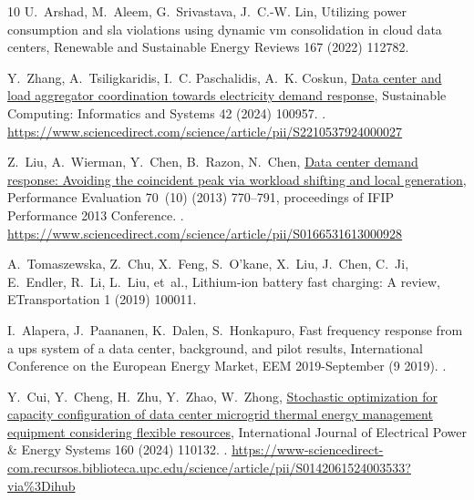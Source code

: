 \documentclass[preprint,12pt]{elsarticle}
\begin{document}
\begin{thebibliography}{10}
U.~Arshad, M.~Aleem, G.~Srivastava, J.~C.-W. Lin, Utilizing power consumption
  and sla violations using dynamic vm consolidation in cloud data centers,
  Renewable and Sustainable Energy Reviews 167 (2022) 112782.

Y.~Zhang, A.~Tsiligkaridis, I.~C. Paschalidis, A.~K. Coskun,
  \href{https://www.sciencedirect.com/science/article/pii/S2210537924000027}{Data
  center and load aggregator coordination towards electricity demand response},
  Sustainable Computing: Informatics and Systems 42 (2024) 100957.
\newblock \href {https://doi.org/https://doi.org/10.1016/j.suscom.2024.100957}
  {}.
\newline\urlprefix\url{https://www.sciencedirect.com/science/article/pii/S2210537924000027}

Z.~Liu, A.~Wierman, Y.~Chen, B.~Razon, N.~Chen,
  \href{https://www.sciencedirect.com/science/article/pii/S0166531613000928}{Data
  center demand response: Avoiding the coincident peak via workload shifting
  and local generation}, Performance Evaluation 70~(10) (2013) 770--791,
  proceedings of IFIP Performance 2013 Conference.
\newblock \href {https://doi.org/https://doi.org/10.1016/j.peva.2013.08.014}
  {}.
\newline\urlprefix\url{https://www.sciencedirect.com/science/article/pii/S0166531613000928}

A.~Tomaszewska, Z.~Chu, X.~Feng, S.~O'kane, X.~Liu, J.~Chen, C.~Ji, E.~Endler,
  R.~Li, L.~Liu, et~al., Lithium-ion battery fast charging: A review,
  ETransportation 1 (2019) 100011.

I.~Alapera, J.~Paananen, K.~Dalen, S.~Honkapuro, Fast frequency response from a
  ups system of a data center, background, and pilot results, International
  Conference on the European Energy Market, EEM 2019-September (9 2019).
\newblock \href {https://doi.org/10.1109/EEM.2019.8916344}
  {}.

Y.~Cui, Y.~Cheng, H.~Zhu, Y.~Zhao, W.~Zhong,
  \href{https://www-sciencedirect-com.recursos.biblioteca.upc.edu/science/article/pii/S0142061524003533?via%3Dihub}{Stochastic
  optimization for capacity configuration of data center microgrid thermal
  energy management equipment considering flexible resources}, International
  Journal of Electrical Power \& Energy Systems 160 (2024) 110132.
\newblock \href {https://doi.org/10.1016/J.IJEPES.2024.110132}
  {}.
\newline\urlprefix\url{https://www-sciencedirect-com.recursos.biblioteca.upc.edu/science/article/pii/S0142061524003533?via%3Dihub}


\end{thebibliography}
\end{document}

